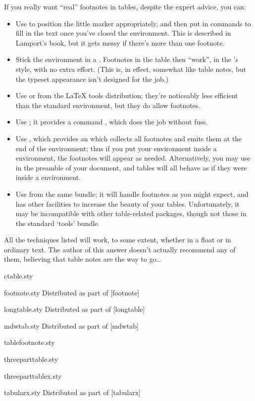 If you really want ``real'' footnotes in tables, despite the expert
advice, you can:
\begin{itemize}
\item Use  to position the little marker
  appropriately, and then put in  commands to fill in
  the text once you've closed the  environment.
  This is described in Lamport's book, but it gets messy if there's
  more than one footnote.
\item Stick the  environment in a
  .  Footnotes in the 
  table then ``work'', in the 's style, with no
  extra effort.  (This is, in effect, somewhat like table notes, but
  the typeset appearance isn't designed for the job.)
\item Use  or  from the \LaTeX{}
  tools distribution; they're noticeably less efficient than the
  standard  environment, but they do allow
  footnotes.
\item Use ; it provides a command ,
  which does the job without fuss.
\item Use , which provides an
   which collects all footnotes and emits them
  at the end of the environment; thus if you put your
   environment inside a 
  environment, the footnotes will appear as needed.  Alternatively,
  you may use  in the preamble of your
  document, and tables will all behave as if they were inside a
   environment.
\item Use  from the same bundle; it will handle
  footnotes as you might expect, and has other facilities to increase
  the beauty of your tables.  Unfortunately, it may be incompatible
  with other table-related packages, though not those in the standard `tools'
  bundle.
\end{itemize}
All the techniques listed will work, to some extent, whether in a float or
in ordinary text.  The author of this  answer doesn't actually
recommend any of them, believing that table notes are the way to go\dots{}
\begin{ctanrefs}
\item[ctable.sty]
\item[footnote.sty]Distributed as part of [footnote]
\item[longtable.sty]Distributed as part of [longtable]
\item[mdwtab.sty]Distributed as part of [mdwtab]
\item[tablefootnote.sty]
\item[threeparttable.sty]
\item[threeparttablex.sty]
\item[tabularx.sty]Distributed as part of [tabularx]
\end{ctanrefs}

